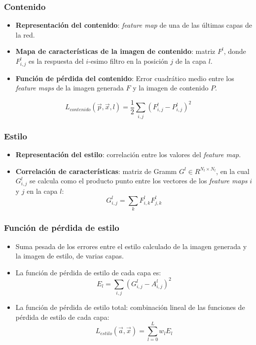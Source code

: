 \documentclass[10pt,center]{beamer}
\begin{document}
\begin{frame}
 \frametitle{Contenido}
  \begin{itemize}
   \item \textbf{Representación del contenido}: \textit{feature map} de una de las últimas capas de la red.
   \item \textbf{Mapa de características de la imagen de contenido}: matriz $F^l$, donde $F_{i,j}^l$ es la respuesta del $i$-esimo filtro en la posición $j$ de la capa $l$.
   \item \textbf{Función de pérdida del contenido}: Error cuadrático medio entre los \textit{feature maps} de la imagen generada $F$ y la imagen de contenido $P$.
  \end{itemize}
  \begin{equation*}
    L_{contenido}(\overrightarrow{p},\overrightarrow{x}, l) = \frac{1}{2} \sum_{i,j} (F_{i,j}^l - P_{i,j}^l)^2
  \end{equation*}
\end{frame}

\begin{frame}
 \frametitle{Estilo}
  \begin{itemize}
    \item \textbf{Representación del estilo}: correlación entre los valores del \textit{feature map}.
    \item \textbf{Correlación de características}: matriz de Gramm $G^l \in R^{N_l \times N_l}$, en la cual $G_{i,j}^l$ se calcula como el producto punto entre los vectores
      de los \textit{feature maps} $i$ y $j$ en la capa $l$:
	\begin{equation*}
	  G_{i,j}^l = \sum_{k} F_{i,k}^l F_{j,k}^l
	\end{equation*}
  \end{itemize}

\end{frame}

\begin{frame}
  \frametitle{Función de pérdida de estilo}
  \begin{itemize}
   \item Suma pesada de los errores entre el estilo calculado de la imagen generada y la imagen de estilo, de varias capas.
   \item La función de pérdida de estilo de cada capa es:
      \begin{equation*}
	E_l = \sum_{i,j} (G_{i,j}^l - A_{i,j}^l)^2
      \end{equation*}
   \item La función de pérdida de estilo total: combinación lineal de las funciones de pérdida de estilo de cada capa:
      \begin{equation*}
	L_{estilo}(\overrightarrow{a},\overrightarrow{x}) = \sum_{l=0}^{L} w_l E_l
      \end{equation*}
  \end{itemize}
\end{frame}
\end{document}
